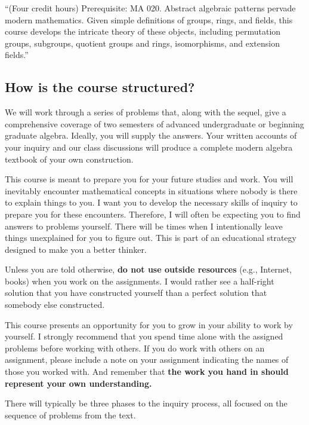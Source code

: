 \documentclass[
  twoside]{article}
\begin{document}
``(Four credit hours) Prerequisite: MA 020. Abstract algebraic patterns
pervade modern mathematics. Given simple definitions of groups, rings,
and fields, this course develops the intricate theory of these objects,
including permutation groups, subgroups, quotient groups and rings,
isomorphisms, and extension fields.''

\hypertarget{how-is-the-course-structured}{%
\subsection{How is the course
structured?}\label{how-is-the-course-structured}}

We will work through a series of problems that, along with the sequel,
give a comprehensive coverage of two semesters of advanced undergraduate
or beginning graduate algebra. Ideally, you will supply the answers.
Your written accounts of your inquiry and our class discussions will
produce a complete modern algebra textbook of your own construction.

This course is meant to prepare you for your future studies and work.
You will inevitably encounter mathematical concepts in situations where
nobody is there to explain things to you. I want you to develop the
necessary skills of inquiry to prepare you for these encounters.
Therefore, I will often be expecting you to find answers to problems
yourself. There will be times when I intentionally leave things
unexplained for you to figure out. This is part of an educational
strategy designed to make you a better thinker.

Unless you are told otherwise, \textbf{do not use outside resources}
(e.g., Internet, books) when you work on the assignments. I would rather
see a half-right solution that you have constructed yourself than a
perfect solution that somebody else constructed.

This course presents an opportunity for you to grow in your ability to
work by yourself. I strongly recommend that you spend time alone with
the assigned problems before working with others. If you do work with
others on an assignment, please include a note on your assignment
indicating the names of those you worked with. And remember that
\textbf{the work you hand in should represent your own understanding.}

There will typically be three phases to the inquiry process, all focused
on the sequence of problems from the text.
\end{document}
